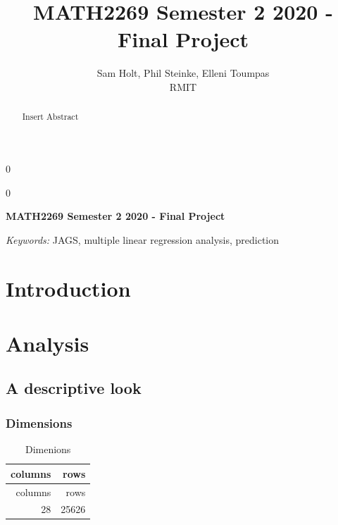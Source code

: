 \documentclass[12pt]{article}
\newcommand{\blind}{0}
\begin{document}
\def\spacingset#1{\renewcommand{\baselinestretch}%
{#1}\small\normalsize} \spacingset{1}



\blind
{
  \title{\bf MATH2269 Semester 2 2020 - Final Project}

  \author{
        Sam Holt, Phil Steinke, Elleni Toumpas \\
    RMIT\\
      }
  \maketitle
} \fi

\blind
{
  \bigskip
  \bigskip
  \bigskip
  \begin{center}
    {\LARGE\bf MATH2269 Semester 2 2020 - Final Project}
  \end{center}
  \medskip
} \fi

\bigskip
\begin{abstract}
Insert Abstract
\end{abstract}

\noindent%
{\it Keywords:} JAGS, multiple linear regression analysis, prediction
\vfill

\newpage
\spacingset{1.45} %

\hypertarget{introduction}{%
\section{Introduction}\label{introduction}}

\hypertarget{analysis}{%
\section{Analysis}\label{analysis}}

\hypertarget{a-descriptive-look}{%
\subsection{A descriptive look}\label{a-descriptive-look}}

\hypertarget{dimensions}{%
\subsubsection{Dimensions}\label{dimensions}}

\begin{longtable}[]{@{}rr@{}}
\caption{Dimenions}\tabularnewline
\toprule
columns & rows\tabularnewline
\midrule
\endfirsthead
\toprule
columns & rows\tabularnewline
\midrule
\endhead
28 & 25626\tabularnewline
\bottomrule
\end{longtable}
\end{document}
